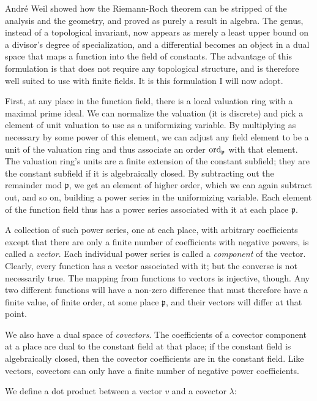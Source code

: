 Andr\'e Weil showed how the Riemann-Roch theorem can be stripped of
the analysis and the geometry, and proved as purely a result in
algebra.  The genus, instead of a topological invariant, now appears
as merely a least upper bound on a divisor's degree of specialization,
and a differential becomes an object in a dual space that maps a
function into the field of constants.  The advantage of this
formulation is that does not require any topological structure, and is
therefore well suited to use with finite fields.  It is this
formulation I will now adopt.

First, at any place in the function field, there is a local valuation
ring with a maximal prime ideal.  We can normalize the valuation (it
is discrete) and pick a element of unit valuation to use as a
uniformizing variable.  By multiplying as necessary by some power of
this element, we can adjust any field element to be a unit of the
valuation ring and thus associate an order ${\rm ord}_{\mathfrak{p}}$
with that element.  The valuation ring's units are a finite extension
of the constant subfield; they are the constant subfield if it is
algebraically closed.  By subtracting out the remainder mod
$\mathfrak{p}$, we get an element of higher order, which we can again
subtract out, and so on, building a power series in the uniformizing
variable.  Each element of the function field thus has a power series
associated with it at each place $\mathfrak{p}$.

A collection of such power series, one at each place, with arbitrary
coefficients except that there are only a finite number of
coefficients with negative powers, is called a {\it vector}.  Each
individual power series is called a {\it component} of the vector.
Clearly, every function has a vector associated with it; but the
converse is not necessarily true.  The mapping from functions to
vectors is injective, though.  Any two different functions will have a
non-zero difference that must therefore have a finite value, of finite
order, at some place $\mathfrak{p}$, and their vectors will differ at
that point.

We also have a dual space of {\it covectors}.  The coefficients of a
covector component at a place are dual to the constant field at that
place; if the constant field is algebraically closed, then the
covector coefficients are in the constant field.  Like vectors,
covectors can only have a finite number of negative power
coefficients.

We define a dot product between a vector $v$ and a covector $\lambda$:

